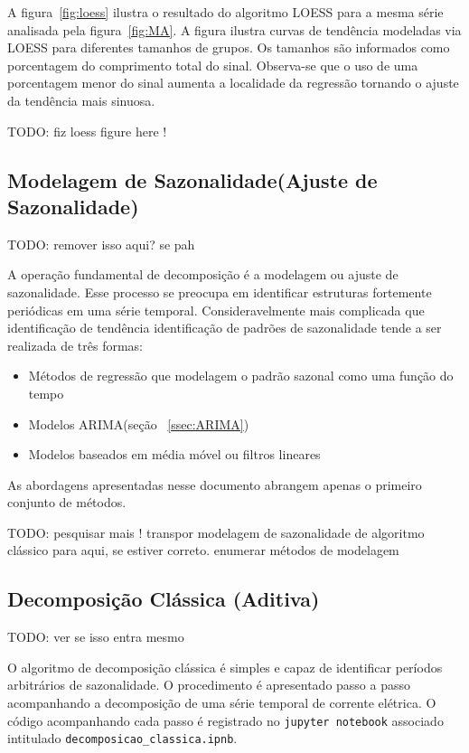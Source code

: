 A figura~\ref{fig:loess} ilustra o resultado do algoritmo LOESS para a mesma
série analisada pela figura~\ref{fig:MA}. A figura ilustra curvas de tendência
modeladas via LOESS para diferentes tamanhos de grupos. Os tamanhos são
informados como porcentagem do comprimento total do sinal. Observa-se que o uso
de uma porcentagem menor do sinal aumenta a localidade da regressão tornando o
ajuste da tendência mais sinuosa.

TODO: fiz loess figure here !

\subsection{Modelagem de Sazonalidade(Ajuste de Sazonalidade)}

TODO: remover isso aqui? se pah

A operação fundamental de decomposição é a modelagem ou ajuste de sazonalidade.
Esse processo se preocupa em identificar estruturas fortemente periódicas em
uma série temporal. Consideravelmente mais complicada que identificação de
tendência identificação de padrões de sazonalidade tende a ser realizada de
três formas:

\begin{itemize}
    \item Métodos de regressão que modelagem o padrão sazonal como uma função
    do tempo
    \item Modelos ARIMA(seção ~\ref{ssec:ARIMA})
    \item Modelos baseados em média móvel ou filtros lineares
\end{itemize}

As abordagens apresentadas nesse documento abrangem apenas o primeiro conjunto
de métodos.

TODO: pesquisar mais ! transpor modelagem de sazonalidade de algoritmo clássico
para aqui, se estiver correto. enumerar métodos de modelagem

\subsection{Decomposição Clássica (Aditiva)}

TODO: ver se isso entra mesmo

O algoritmo de decomposição clássica é simples e capaz de identificar períodos
arbitrários de sazonalidade. O procedimento é apresentado passo a passo
acompanhando a decomposição de uma série temporal de corrente elétrica. O
código acompanhando cada passo é registrado no \verb+jupyter notebook+
associado intitulado \verb+decomposicao_classica.ipnb+.

